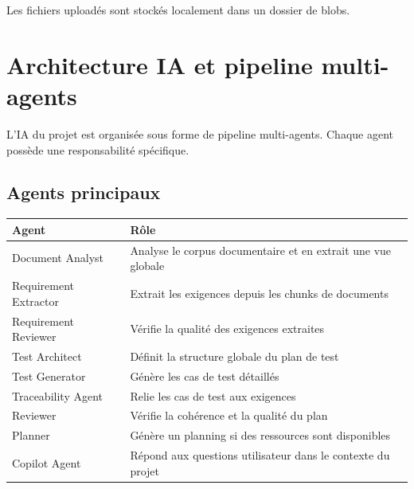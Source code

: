\documentclass[
  french,
]{report}
\newcounter{none} %
\begin{document}
Les fichiers uploadés sont stockés localement dans un dossier de blobs.

\chapter{Architecture IA et pipeline
multi-agents}\label{architecture-ia-et-pipeline-multi-agents}

L'IA du projet est organisée sous forme de pipeline multi-agents. Chaque
agent possède une responsabilité spécifique.

\begin{center}
\end{center}

\section{Agents principaux}\label{agents-principaux}

{\def\LTcaptype{none} %
\begin{longtable}[]{@{}
  >{\raggedright\arraybackslash}p{}
  >{\raggedright\arraybackslash}p{}@{}}
\toprule\noalign{}
\begin{minipage}[b]{\linewidth}\raggedright
Agent
\end{minipage} & \begin{minipage}[b]{\linewidth}\raggedright
Rôle
\end{minipage} \\
\midrule\noalign{}
\endhead
\bottomrule\noalign{}
\endlastfoot
Document Analyst & Analyse le corpus documentaire et en extrait une vue
globale \\
Requirement Extractor & Extrait les exigences depuis les chunks de
documents \\
Requirement Reviewer & Vérifie la qualité des exigences extraites \\
Test Architect & Définit la structure globale du plan de test \\
Test Generator & Génère les cas de test détaillés \\
Traceability Agent & Relie les cas de test aux exigences \\
Reviewer & Vérifie la cohérence et la qualité du plan \\
Planner & Génère un planning si des ressources sont disponibles \\
Copilot Agent & Répond aux questions utilisateur dans le contexte du
projet \\
\end{longtable}
}
\end{document}
